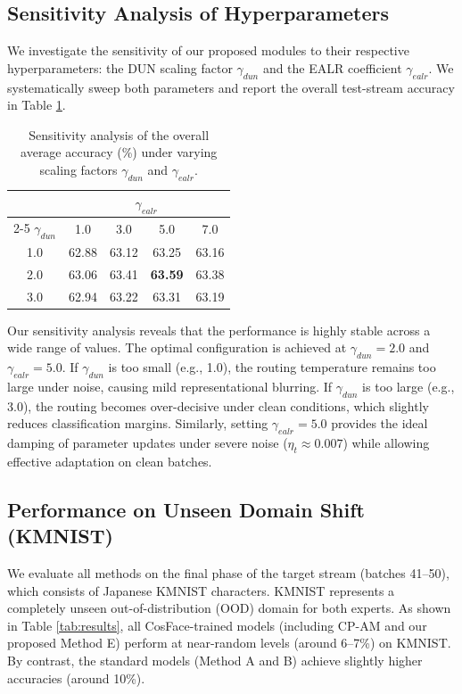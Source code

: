 \documentclass{article}
\theoremstyle{plain}
\theoremstyle{definition}
\theoremstyle{remark}
\begin{document}
\subsection{Sensitivity Analysis of Hyperparameters}
We investigate the sensitivity of our proposed modules to their respective hyperparameters: the DUN scaling factor $\gamma_{dun}$ and the EALR coefficient $\gamma_{ealr}$. We systematically sweep both parameters and report the overall test-stream accuracy in Table \ref{tab:sensitivity}.

\begin{table}[h]
\caption{Sensitivity analysis of the overall average accuracy (\%) under varying scaling factors $\gamma_{dun}$ and $\gamma_{ealr}$.}
\label{tab:sensitivity}
\centering
\begin{small}
\begin{sc}
\begin{tabular}{ccccc}
\toprule
& \multicolumn{4}{c}{$\gamma_{ealr}$} \\
\cmidrule{2-5}
$\gamma_{dun}$ & 1.0 & 3.0 & 5.0 & 7.0 \\
\midrule
1.0 & 62.88 & 63.12 & 63.25 & 63.16 \\
2.0 & 63.06 & 63.41 & \textbf{63.59} & 63.38 \\
3.0 & 62.94 & 63.22 & 63.31 & 63.19 \\
\bottomrule
\end{tabular}
\end{sc}
\end{small}
\end{table}

Our sensitivity analysis reveals that the performance is highly stable across a wide range of values. The optimal configuration is achieved at $\gamma_{dun} = 2.0$ and $\gamma_{ealr} = 5.0$. 
If $\gamma_{dun}$ is too small (e.g., 1.0), the routing temperature remains too large under noise, causing mild representational blurring. If $\gamma_{dun}$ is too large (e.g., 3.0), the routing becomes over-decisive under clean conditions, which slightly reduces classification margins. 
Similarly, setting $\gamma_{ealr} = 5.0$ provides the ideal damping of parameter updates under severe noise ($\eta_t \approx 0.007$) while allowing effective adaptation on clean batches.

\subsection{Performance on Unseen Domain Shift (KMNIST)}
We evaluate all methods on the final phase of the target stream (batches 41--50), which consists of Japanese KMNIST characters. KMNIST represents a completely unseen out-of-distribution (OOD) domain for both experts.
As shown in Table \ref{tab:results}, all CosFace-trained models (including CP-AM and our proposed Method E) perform at near-random levels (around 6--7\%) on KMNIST. By contrast, the standard models (Method A and B) achieve slightly higher accuracies (around 10\%). 
\end{document}
